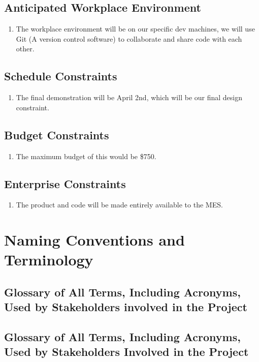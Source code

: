 \documentclass[12pt]{article}
\begin{document}
\subsection{Anticipated Workplace Environment}
\begin{enumerate}
  \item The workplace environment will be on our specific dev machines, we will use Git (A version control software) to collaborate and share code with each other.
\end{enumerate}
\subsection{Schedule Constraints}
\begin{enumerate}
  \item The final demonstration will be April 2nd, which will be our final design constraint.
\end{enumerate}
\subsection{Budget Constraints}
\begin{enumerate}
  \item The maximum budget of this would be \$750.
\end{enumerate}
\subsection{Enterprise Constraints}
\begin{enumerate}
  \item The product and code will be made entirely available to the MES.
\end{enumerate}

\section{Naming Conventions and Terminology}
\subsection{Glossary of All Terms, Including Acronyms, Used by Stakeholders
involved in the Project}

\subsection{Glossary of All Terms, Including Acronyms, Used by Stakeholders Involved in the Project}
\end{document}
